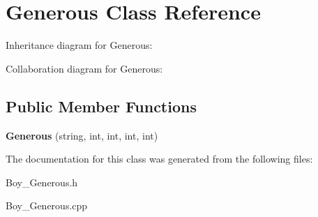 \hypertarget{classGenerous}{}\section{Generous Class Reference}
\label{classGenerous}


Inheritance diagram for Generous\+:


Collaboration diagram for Generous\+:
\subsection*{Public Member Functions}
\begin{DoxyCompactItemize}
\item 
{\bfseries Generous} (string, int, int, int, int)\hypertarget{classGenerous_a17907091f86404fc9877b55b7e727a4c}{}\label{classGenerous_a17907091f86404fc9877b55b7e727a4c}

\end{DoxyCompactItemize}


The documentation for this class was generated from the following files\+:\begin{DoxyCompactItemize}
\item 
Boy\+\_\+\+Generous.\+h\item 
Boy\+\_\+\+Generous.\+cpp\end{DoxyCompactItemize}
